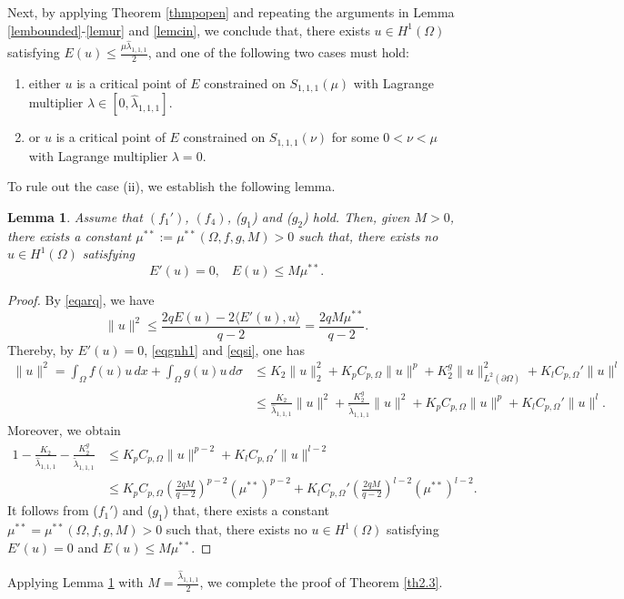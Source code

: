 \documentclass[11pt]{amsart}
\newtheorem{lemma}[theorem]{Lemma}
\newcommand{\norm}[1]{\lVert#1\rVert}
\numberwithin{equation}{section}
\begin{document}
Next, by applying Theorem \ref{thmpopen} and repeating the arguments in Lemma \ref{lembounded}-\ref{lemur} and \ref{lemcin}, we conclude that, there exists $u \in H^1(\Omega)$ satisfying $E(u)\leq \frac{\mu\hat{\lambda}_{1,1,1}}{2}$, and one of the following two cases must hold:
     \begin{enumerate}[label=\rm(\roman*)]
\item either $u$ is a critical point of $E$ constrained on $S_{1,1,1}(\mu)$ with Lagrange multiplier $\lambda \in [0,\hat{\lambda}_{1,1,1}]$.
\item  or $u$ is a critical point of $E$ constrained on $S_{1,1,1}(\nu)$ for some $0<\nu < \mu$ with Lagrange multiplier $\lambda =0$.
    \end{enumerate}
To rule out the case (ii), we establish the following lemma.
\begin{lemma}\label{lemnonnomass}
   Assume that $(f_1')$, $(f_4)$, ($g_1$) and ($g_2$) hold. Then, given $M>0$, there exists a constant $\mu^{**}:=\mu^{**}(\Omega,f,g,M)>0$ such that, there exists no $u \in H^1(\Omega)$ satisfying
   $$
   E'(u) = 0, \,\,\,\,\,E(u)\leq M\mu^{**}.
   $$
\end{lemma}
\begin{proof}
By \eqref{eqarq}, we have
    $$
    \norm{u}^2 \leq \frac{2qE(u)-2\langle E'(u),u\rangle}{q-2}=\frac{2qM\mu^{**}}{q-2}.
    $$
Thereby, by $E'(u)=0$, \eqref{eqgnh1} and \eqref{eqsi}, one has
\begin{equation*}
        \begin{aligned}
        \norm{u}^2=\int_{\Omega}f(u)u\,dx+\int_{\Omega}g(u)u\,d\sigma&\leq K_2 \norm{u}_2^2+K_{p} C_{p,\Omega}\norm{u}^{{p}} +K^g_2\norm{u}_{L^2(\partial\Omega)}^2 + K_lC_{p,\Omega}'\norm{u}^l\\
        &\leq \frac{K_2}{\hat{\lambda}_{1,1,1}} \norm{u}^2 + \frac{K^g_2}{\tilde{\lambda}_{1,1,1}} \norm{u}^2 +K_{p} C_{p,\Omega}\norm{u}^{{p}} + K_lC_{p,\Omega}'\norm{u}^l.
        \end{aligned}
    \end{equation*}
    Moreover, we obtain
    \begin{equation*}
    \begin{aligned}
            1-\frac{K_2}{\hat{\lambda}_{1,1,1}}-\frac{K^g_2}{\tilde{\lambda}_{1,1,1}}&\leq K_{p} C_{p,\Omega}\norm{u}^{p-2} + K_lC_{p,\Omega}'\norm{u}^{l-2} \\
            &\leq K_{p} C_{p,\Omega}\left(\frac{2qM}{q-2}\right)^{p-2}(\mu^{**})^{p-2}+ K_lC_{p,\Omega}'\left(\frac{2qM}{q-2}\right)^{l-2}(\mu^{**})^{l-2}.
    \end{aligned}
    \end{equation*}
It follows from ($f_1'$) and ($g_1$) that, there exists a constant $\mu^{**}=\mu^{**}(\Omega,f,g,M)>0$ such that, there exists no $u \in H^1(\Omega)$ satisfying $E'(u) = 0$ and $E(u)\leq M\mu^{**}$.
\end{proof}
Applying Lemma \ref{lemnonnomass} with $M=\frac{\hat{\lambda}_{1,1,1}}{2}$, we complete the proof of Theorem \ref{th2.3}.\\
\end{document}
